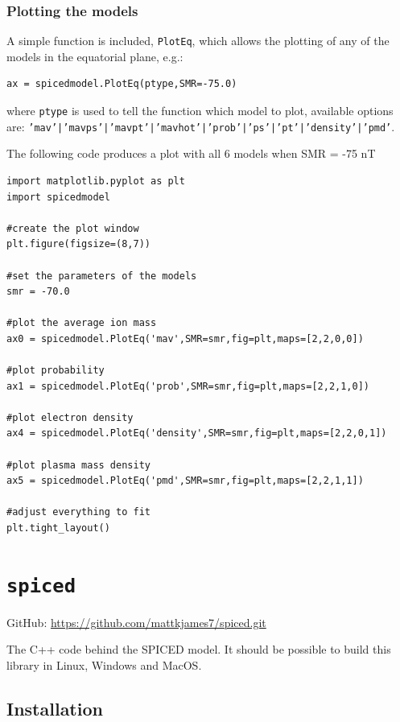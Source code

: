 				\subsubsection{Plotting the models}

					A simple function is included, \texttt{PlotEq}, which allows the plotting of any of the models in the equatorial plane, e.g.:

\begin{verbatim}
ax = spicedmodel.PlotEq(ptype,SMR=-75.0)
\end{verbatim}

					where \texttt{ptype} is used to tell the function which model to plot, available options are: \texttt{'mav'|'mavps'|'mavpt'|'mavhot'|'prob'|'ps'|'pt'|'density'|'pmd'}.

					The following code produces a plot with all 6 models when SMR = -75 nT

\begin{verbatim}
import matplotlib.pyplot as plt
import spicedmodel

#create the plot window
plt.figure(figsize=(8,7))

#set the parameters of the models
smr = -70.0

#plot the average ion mass
ax0 = spicedmodel.PlotEq('mav',SMR=smr,fig=plt,maps=[2,2,0,0])

#plot probability 
ax1 = spicedmodel.PlotEq('prob',SMR=smr,fig=plt,maps=[2,2,1,0])

#plot electron density 
ax4 = spicedmodel.PlotEq('density',SMR=smr,fig=plt,maps=[2,2,0,1])

#plot plasma mass density
ax5 = spicedmodel.PlotEq('pmd',SMR=smr,fig=plt,maps=[2,2,1,1])

#adjust everything to fit
plt.tight_layout()
\end{verbatim}


	\section{\texttt{spiced}}

		GitHub: \href{https://github.com/mattkjames7/spiced.git}{https://github.com/mattkjames7/spiced.git}

		The C++ code behind the SPICED model. It should be possible to build this library in Linux, Windows and MacOS.

		\subsection{Installation}

